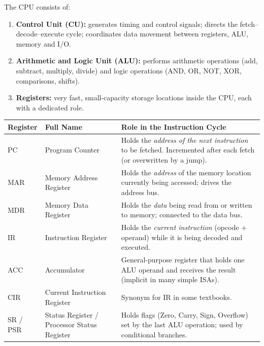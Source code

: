 \documentclass[11pt]{article}
\newcommand{\cle}[1]{{\popxbold\color{popdark}#1}}
\begin{document}
\begin{propriete}
The CPU consists of:
\begin{enumerate}
\item \textbf{Control Unit (CU):} generates timing and control signals; directs the fetch–decode–execute cycle; coordinates data movement between registers, ALU, memory and I/O.
\item \textbf{Arithmetic and Logic Unit (ALU):} performs arithmetic operations (add, subtract, multiply, divide) and logic operations (AND, OR, NOT, XOR, comparisons, shifts).
\item \textbf{Registers:} very fast, small-capacity storage locations inside the CPU, each with a dedicated role.
\end{enumerate}
\end{propriete}

\begin{aretenir}
\begin{center}
\begin{tabularx}{\linewidth}{|l|X|X|}
\hline
\rowcolor{popblueL} \textbf{Register} & \textbf{Full Name} & \textbf{Role in the Instruction Cycle} \\ \hline
PC & Program Counter & Holds the \emph{address of the next instruction} to be fetched. Incremented after each fetch (or overwritten by a jump). \\ \hline
MAR & Memory Address Register & Holds the \emph{address} of the memory location currently being accessed; drives the address bus. \\ \hline
MDR & Memory Data Register & Holds the \emph{data} being read from or written to memory; connected to the data bus. \\ \hline
IR & Instruction Register & Holds the \emph{current instruction} (opcode + operand) while it is being decoded and executed. \\ \hline
ACC & Accumulator & General-purpose register that holds one ALU operand and receives the result (implicit in many simple ISAs). \\ \hline
CIR & Current Instruction Register & Synonym for IR in some textbooks. \\ \hline
SR / PSR & Status Register / Processor Status Register & Holds \cle{flags} (Zero, Carry, Sign, Overflow) set by the last ALU operation; used by conditional branches. \\ \hline
\end{tabularx}
\end{center}
\end{aretenir}
\end{document}
